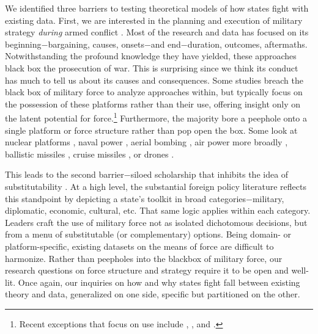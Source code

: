 \documentclass[fleqn,12pt]{article}
\begin{document}
We identified three barriers to testing theoretical models of how states fight with existing data. First, we are interested in the planning and execution of military strategy \textit{during} armed conflict \citep{wallace_alliancesinstitutionaldesign_2008}. Most of the research and data has focused on its beginning$-$bargaining, causes, onsets$-$and end$-$duration, outcomes, aftermaths. Notwithstanding the profound knowledge they have yielded, these approaches black box the prosecution of war. This is surprising since we think its conduct has much to tell us about its causes and consequences. Some studies breach the black box of military force to analyze approaches within, but typically focus on the possession of these platforms rather than their use, offering insight only on the latent potential for force.\footnote{Recent exceptions that focus on use include \citet{martinezmachain_aircampaignduration_2015}, \citet{post_flyingfailcostly_2019}, and \citet{gannon_oneifland_2022a}.} Furthermore, the majority bore a peephole onto a single platform or force structure rather than pop open the box. Some look at nuclear platforms \citep{gartzke_determinantsnuclearforce_2014}, naval power \citep{crisher_powerseanaval_2014}, aerial bombing \citep{pape_bombingwinair_1996}, air power more broadly \citep{horowitz_whendoesaerial_2001, martinezmachain_aircampaignduration_2015, allen_understandingimpactair_2017}, ballistic missiles \citep{reiter_ballisticmissilesinternational_2013}, cruise missiles \citep{early_climbingladderexplaining_2022}, or drones \citep{fuhrmann_droningexplainingproliferation_2017}.

This leads to the second barrier$-$siloed scholarship that inhibits the idea of substitutability \citep{morgan_modelforeignpolicy_2000}. At a high level, the substantial foreign policy literature reflects this standpoint by depicting a state's toolkit in broad categories$-$military, diplomatic, economic, cultural, etc. That same logic applies within each category. Leaders craft the use of military force not as isolated dichotomous decisions, but from a menu of substitutable (or complementary) options. Being domain- or platform-specific, existing datasets on the means of force are difficult to harmonize. Rather than peepholes into the blackbox of military force, our research questions on force structure and strategy require it to be open and well-lit. Once again, our inquiries on how and why states fight fall between existing theory and data, generalized on one side, specific but partitioned on the other.
\end{document}
